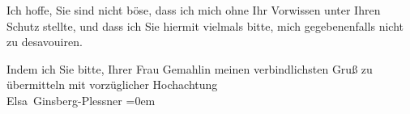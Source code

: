 \pstart
           Ich hoffe, Sie sind nicht böse, dass ich mich ohne Ihr Vorwissen unter Ihren Schutz
               stellte, und dass ich Sie hiermit vielmals bitte, mich gegebenenfalls nicht zu
               desavouiren.\pend
           
\pstart
           Indem ich Sie bitte, Ihrer Frau Gemahlin meinen verbindlichsten Gruß zu übermitteln mit
               vorzüglicher Hochachtung{\\[\baselineskip]}\spacefill\mbox{Elsa Ginsberg-Plessner}\pend
           \leftskip=0em{}\endnumbering{}
\begin{anhang}
\end{anhang}
      